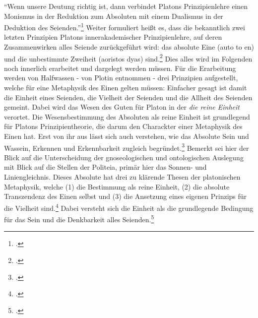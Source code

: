 \enquote{Wenn unsere Deutung richtig ist, dann verbindet Platons Prinzipienlehre einen Monismus in der Reduktion zum Absoluten mit einem Dualismus in der Deduktion des Seienden.}\footcite[][S. 79]{HalfwassenMonismusDualismus} 
Weiter formuliert heißt es, dass die bekanntlich zwei letzten Prinzipien Platons innerakademischer Prinzipienlehre, auf deren Zusammenwirken alles Seiende zurückgeführt wird: das absolute Eine (auto to en) und die unbestimmte Zweiheit (aoristos dyas) sind.\footcite[vgl.][S. 67]{HalfwassenMonismusDualismus}
Dies alles wird im Folgenden noch innerlich erarbeitet und dargelegt werden müssen.
Für die Erarbeitung werden von Halfwassen - von Plotin entnommen - drei Prinzipien aufgestellt, welche für eine Metaphysik des Einen gelten müssen:
Einfacher gesagt ist damit die Einheit eines Seienden, die Vielheit der Seienden und die Allheit des Seienden gemeint.
Dabei wird das Wesen des Guten für Platon in der \emph{die reine Einheit} verortet. Die Wesensbestimmung des Absoluten als reine Einheit ist grundlegend für Platons Prinzipientheorie, die darum den Charackter einer Metaphysik des Einen hat. Erst von ihr aus lässt sich auch verstehen, wie das Absolute Sein und Wassein, Erkennen und Erkennbarkeit zugleich begründet.\footcite[vgl.][S. 96]{halfwassen2015spuren}
Bemerkt sei hier der Blick auf die Unterscheidung der gnoseologischen und ontologischen Auslegung mit Blick auf die Stellen der Politeia, primär hier das Sonnen- und Liniengleichnis. 
Dieses Absolute hat drei zu klärende Thesen der platonischen Metaphysik, welche (1) die Bestimmung als reine Einheit, (2) die absolute Transzendenz des Einen selbst und (3) die Ansetzung eines eigenen Prinzips für die Vielheit sind.\footcite[vgl.][S. 96]{halfwassen2015spuren}
Dabei versteht sich die Einheit als die grundlegende Bedingung für das Sein und die Denkbarkeit alles Seienden.\footcite[vgl.][S. 97]{halfwassen2015spuren} 
